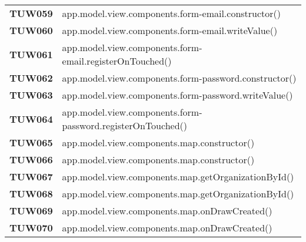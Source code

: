 \documentclass[../../piano-di-qualifica.tex]{subfiles}
\begin{document}
\begin{longtable}[H]{>{\centering\bfseries}m{3cm} >{}m{13cm}}

  TUW059             & app.model.view.components.form-email.constructor\@()                                                    \\

  TUW060             & app.model.view.components.form-email.writeValue\@()                                                     \\

  TUW061             & app.model.view.components.form-email.registerOnTouched\@()                                              \\


  TUW062             & app.model.view.components.form-password.constructor\@()                                                 \\

  TUW063             & app.model.view.components.form-password.writeValue\@()                                                  \\

  TUW064             & app.model.view.components.form-password.registerOnTouched\@()                                           \\


  TUW065             & app.model.view.components.map.constructor\@()                                                           \\

  TUW066             & app.model.view.components.map.constructor\@()                                                           \\

  TUW067             & app.model.view.components.map.getOrganizationById\@()                                                   \\

  TUW068             & app.model.view.components.map.getOrganizationById\@()                                                   \\

  TUW069             & app.model.view.components.map.onDrawCreated\@()                                                         \\

  TUW070             & app.model.view.components.map.onDrawCreated\@()                                                         \\



\end{longtable}
\end{document}
